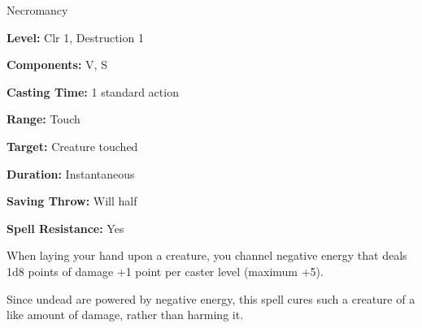 
Necromancy

\textbf{Level:} Clr 1, Destruction 1

\textbf{Components:} V, S

\textbf{Casting Time:} 1 standard action

\textbf{Range:} Touch

\textbf{Target:} Creature touched

\textbf{Duration:} Instantaneous

\textbf{Saving Throw:} Will half

\textbf{Spell Resistance:} Yes

When laying your hand upon a creature, you channel negative energy that deals 1d8 
points of damage +1 point per caster level (maximum +5).

Since undead are powered by negative energy, this spell cures such a creature of 
a like amount of damage, rather than harming it.

